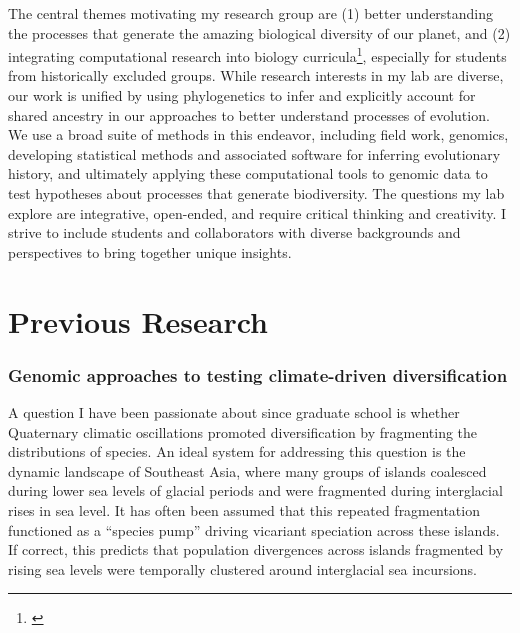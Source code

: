 \noindent
The central themes motivating my research group are
(1) better understanding the processes that generate the amazing biological
diversity of our planet,
and
(2) integrating computational research into biology
curricula\footnote{\label{Wright19}\hspace{-0.8em}},
especially for students from historically excluded groups.
While research interests in my lab are diverse, our work is unified by using
phylogenetics to infer and explicitly account for shared ancestry in our
approaches to better understand processes of evolution.
We use a broad suite of methods in this endeavor, including
field work,
genomics,
developing statistical methods and associated software for inferring
evolutionary history, and ultimately applying these computational tools to
genomic data to test
hypotheses about processes that generate biodiversity.
The questions my lab explore are integrative, open-ended, and require critical
thinking and creativity.
I strive to include students and collaborators with diverse backgrounds and
perspectives to bring together unique insights.

\section*{Previous Research}
\subsubsection*{Genomic approaches to testing climate-driven diversification}
A question I have been passionate about since graduate school is whether
Quaternary climatic oscillations promoted diversification by fragmenting the
distributions of species.
An ideal system for addressing this question is the dynamic landscape of
Southeast Asia, where many groups of islands coalesced during lower sea levels
of glacial periods and were fragmented during interglacial rises in sea level.
It has often been assumed that this repeated fragmentation functioned as a
``species pump'' driving vicariant speciation across these islands.
If correct, this predicts that population divergences across islands fragmented
by rising sea levels were temporally clustered around interglacial sea
incursions.

